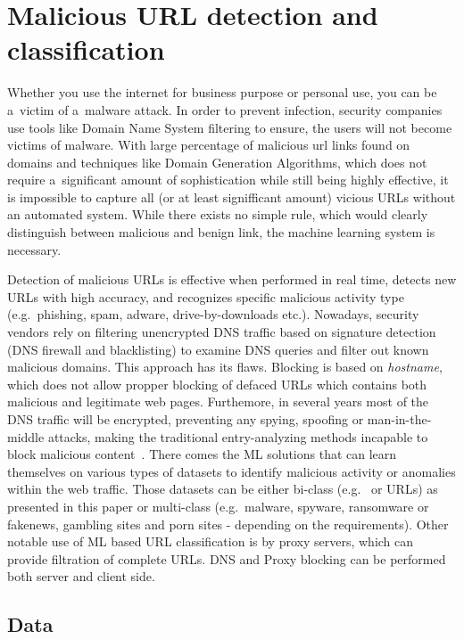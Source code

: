\chapter{Malicious URL detection and classification}\label{ch:malicious-url-detection-and-classification}

Whether you use the internet for business purpose or personal use, you can be a~victim of a~malware attack.
In order to prevent infection, security companies use tools like Domain Name System filtering to ensure, the users will not become victims of malware.
With large percentage of malicious \acrshort{url} links found on  domains and techniques like Domain Generation Algorithms, which does not require a~significant amount of sophistication while still being highly effective, it is impossible to capture all (or at least signifficant amount) vicious URLs without an automated system.
While there exists no simple rule, which would clearly distinguish between malicious and benign link, the machine learning system is necessary.

Detection of malicious URLs is effective when performed in real time, detects new URLs with high accuracy, and recognizes specific malicious activity type (e.g.\ phishing, spam, adware, drive-by-downloads etc.).
Nowadays, security vendors rely on filtering unencrypted DNS traffic based on signature detection (DNS firewall and blacklisting) to examine DNS queries and filter out known malicious domains.
This approach has its flaws.
Blocking is based on \textit{hostname}, which does not allow propper blocking of defaced URLs which contains both malicious and legitimate web pages.
Furthemore, in several years most of the DNS traffic will be encrypted, preventing any spying, spoofing or man-in-the-middle attacks, making the traditional entry-analyzing methods incapable to block malicious content~\cite{web:dns-encryption}.
There comes the ML solutions that can learn themselves on various types of datasets to identify malicious activity or anomalies within the web traffic.
Those datasets can be either bi-class (e.g.\  or  URLs) as presented in this paper or multi-class (e.g.\ malware, spyware, ransomware or fakenews, gambling sites and porn sites - depending on the requirements).
Other notable use of ML based URL classification is by proxy servers, which can provide filtration of complete URLs.
DNS and Proxy blocking can be performed both server and client side.

\section{Data}\label{sec:data}

